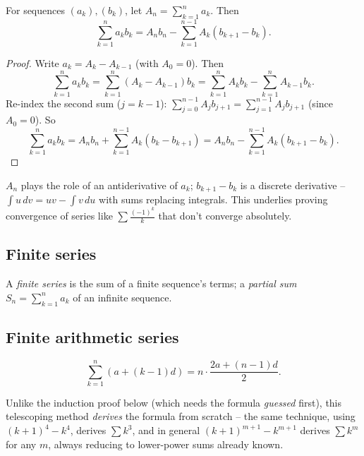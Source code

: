 \documentclass[11pt]{article}
\begin{document}
\bigskip
\begin{theorem}
For sequences $(a_k),(b_k)$, let $A_n=\sum_{k=1}^n a_k$. Then
\[
\sum_{k=1}^n a_k b_k = A_n b_n - \sum_{k=1}^{n-1} A_k(b_{k+1}-b_k).
\]
\end{theorem}
\begin{proof}
Write $a_k = A_k-A_{k-1}$ (with $A_0=0$). Then
\[
\sum_{k=1}^n a_kb_k = \sum_{k=1}^n(A_k-A_{k-1})b_k = \sum_{k=1}^n A_kb_k - \sum_{k=1}^n A_{k-1}b_k.
\]
Re-index the second sum ($j=k-1$): $\sum_{j=0}^{n-1}A_jb_{j+1} = \sum_{j=1}^{n-1}A_jb_{j+1}$ (since $A_0=0$). So
\[
\sum_{k=1}^n a_kb_k = A_nb_n + \sum_{k=1}^{n-1}A_k(b_k-b_{k+1}) = A_nb_n - \sum_{k=1}^{n-1}A_k(b_{k+1}-b_k).
\]
\end{proof}

\begin{note}
$A_n$ plays the role of an antiderivative of $a_k$; $b_{k+1}-b_k$ is a discrete derivative -- $\int u\,dv = uv-\int v\,du$ with sums replacing integrals. This underlies proving convergence of series like $\sum\frac{(-1)^k}{k}$ that don't converge absolutely.
\end{note}

\subsection{Finite series}
\label{sec:6-11}

\begin{note}
A \emph{finite series} is the sum of a finite sequence's terms; a \emph{partial sum} $S_n=\sum_{k=1}^n a_k$ of an infinite sequence.
\end{note}

\subsection{Finite arithmetic series}
\label{sec:6-12}

\begin{theorem}
\[
\sum_{k=1}^n (a+(k-1)d) = n\cdot\frac{2a+(n-1)d}{2}.
\]
\end{theorem}

\begin{note}
Unlike the induction proof below (which needs the formula \emph{guessed} first), this telescoping method \emph{derives} the formula from scratch -- the same technique, using $(k+1)^4-k^4$, derives $\sum k^3$, and in general $(k+1)^{m+1}-k^{m+1}$ derives $\sum k^m$ for any $m$, always reducing to lower-power sums already known.
\end{note}
\end{document}
